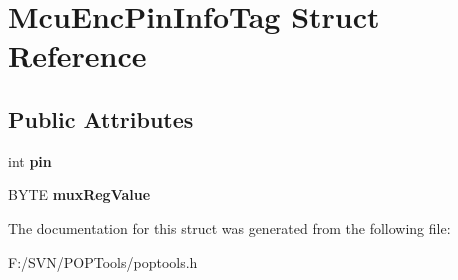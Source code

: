 \hypertarget{struct_mcu_enc_pin_info_tag}{\section{Mcu\-Enc\-Pin\-Info\-Tag Struct Reference}
\label{struct_mcu_enc_pin_info_tag}
}
\subsection*{Public Attributes}
\begin{DoxyCompactItemize}
\item 
\hypertarget{struct_mcu_enc_pin_info_tag_a901af58079aa8399c4a45f19e445d733}{int {\bfseries pin}}\label{struct_mcu_enc_pin_info_tag_a901af58079aa8399c4a45f19e445d733}

\item 
\hypertarget{struct_mcu_enc_pin_info_tag_a9e31c06106b3b3f1ce31d5da11d286f3}{B\-Y\-T\-E {\bfseries mux\-Reg\-Value}}\label{struct_mcu_enc_pin_info_tag_a9e31c06106b3b3f1ce31d5da11d286f3}

\end{DoxyCompactItemize}


The documentation for this struct was generated from the following file\-:\begin{DoxyCompactItemize}
\item 
F\-:/\-S\-V\-N/\-P\-O\-P\-Tools/poptools.\-h\end{DoxyCompactItemize}
